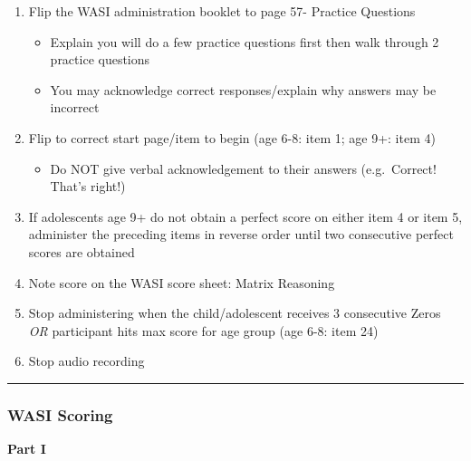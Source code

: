 \documentclass[]{book}
\providecommand{\tightlist}{%
  \setlength{\itemsep}{0pt}\setlength{\parskip}{0pt}}
\begin{document}
\begin{enumerate}
\def\labelenumi{\arabic{enumi}.}
\tightlist
\item
  Flip the WASI administration booklet to page 57- Practice Questions

  \begin{itemize}
  \tightlist
  \item
    Explain you will do a few practice questions first then walk through 2 practice questions
  \item
    You may acknowledge correct responses/explain why answers may be incorrect
  \end{itemize}
\item
  Flip to correct start page/item to begin (age 6-8: item 1; age 9+: item 4)

  \begin{itemize}
  \tightlist
  \item
    Do NOT give verbal acknowledgement to their answers (e.g.~Correct! That's right!)
  \end{itemize}
\item
  If adolescents age 9+ do not obtain a perfect score on either item 4 or item 5, administer the preceding items in reverse order until two consecutive perfect scores are obtained
\item
  Note score on the WASI score sheet: Matrix Reasoning
\item
  Stop administering when the child/adolescent receives 3 consecutive Zeros \emph{OR} participant hits max score for age group (age 6-8: item 24)
\item
  Stop audio recording
\end{enumerate}

\begin{center}\rule{0.5\linewidth}{\linethickness}\end{center}

\hypertarget{wasi-scoring}{%
\subsubsection{WASI Scoring}\label{wasi-scoring}}

\textbf{Part I}
\end{document}
